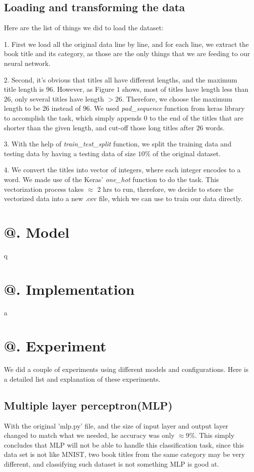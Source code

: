 \documentclass[jou,apacite, 10px]{apa6}
\makeatletter
\newcommand*{\rom}[1]{\expandafter\@slowromancap\romannumeral #1@}
\makeatother
\begin{document}
\subsection{Loading and transforming the data}
Here are the list of things we did to load the dataset:

\rule{0pt}{4ex}  1. First we load all the original data line by line, and for each line, we extract the book title and its category, as those are the only things that we are feeding to our neural network.

\rule{0pt}{4ex}  2. Second, it's obvious that titles all have different lengths, and the maximum title length is $96$. However, as Figure $1$ shows, most of titles have length less than $26$, only several titles have length $>26$. Therefore, we choose the maximum length to be $26$ instead of $96$. We used \textit{pad\_sequence} function from keras library to accomplish the task, which simply appends $0$ to the end of the titles that are shorter than the given length, and cut-off those long titles after $26$ words.

\rule{0pt}{4ex}  3. With the help of \textit{train\_test\_split} function, we split the training data and testing data by having a testing data of size $10\%$ of the original dataset.

\rule{0pt}{4ex}  4. We convert the titles into vector of integers, where each integer encodes to a word. We made use of the Keras' \textit{one\_hot} function to do the task. This vectorization process takes $\approx$ 2 hrs to run, therefore, we decide to store the vectorized data into a new .csv file, which we can use to train our data directly.

\section{\rom{3}. Model}
q
\section{\rom{4}. Implementation}
a
\section{\rom{5}. Experiment}
We did a couple of experiments using different models and configurations. Here is a detailed list and explanation of these experiments.

\subsection{Multiple layer perceptron(MLP)}
With the original 'mlp.py' file, and the size of input layer and output layer  changed to match what we needed, he accuracy was only $\approx$9\%. This simply concludes that MLP will not be able to handle this classification task, since this data set is not like MNIST, two book titles from the same category may be very different, and classifying such dataset is not something MLP is good at.
\end{document}
